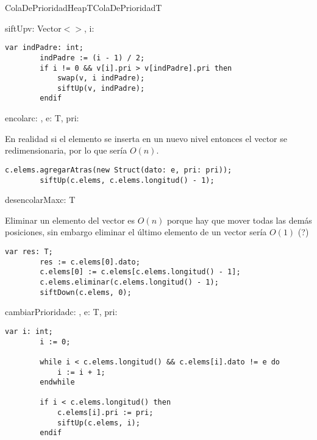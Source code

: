 \begin{module}{ColaDePrioridadHeap}{T}{ColaDePrioridad}{T}
	\pagebreak

	\begin{proc}{siftUp}{\Inout v: Vector$<$$>$, \In i: \Int}{}
		\begin{lstlisting}[numbers=none,frame=none]
		var indPadre: int;
		indPadre := (i - 1) / 2;
		if i != 0 && v[i].pri > v[indPadre].pri then
			swap(v, i indPadre);
			siftUp(v, indPadre);
		endif
		\end{lstlisting}
	\end{proc}

	\begin{proc}{encolar}{\Inout c: \moduletype, \In e: T, \In pri: \float}{}

		En realidad si el elemento se inserta en un nuevo nivel entonces el vector se redimensionaria, por lo que sería $O(n)$.
		\begin{lstlisting}[numbers=none,frame=none]
		c.elems.agregarAtras(new Struct(dato: e, pri: pri));
		siftUp(c.elems, c.elems.longitud() - 1);
		\end{lstlisting}
	\end{proc}

	\begin{proc}{desencolarMax}{\Inout c: \moduletype}{T}

		Eliminar un elemento del vector es $O(n)$ porque hay que mover todas las demás posiciones, sin embargo eliminar el último elemento de un vector sería $O(1)$ (?)
		\begin{lstlisting}[numbers=none,frame=none]
		var res: T;
		res := c.elems[0].dato;
		c.elems[0] := c.elems[c.elems.longitud() - 1];
		c.elems.eliminar(c.elems.longitud() - 1);
		siftDown(c.elems, 0);
		\end{lstlisting}
	\end{proc}

	\begin{proc}{cambiarPrioridad}{\Inout c: \moduletype, \In e: T, \In pri: \float}{}
		\begin{lstlisting}[numbers=none,frame=none]
		var i: int;
		i := 0;

		while i < c.elems.longitud() && c.elems[i].dato != e do
			i := i + 1;
		endwhile

		if i < c.elems.longitud() then
			c.elems[i].pri := pri;
			siftUp(c.elems, i);
		endif
		\end{lstlisting}
	\end{proc}

\end{module}

